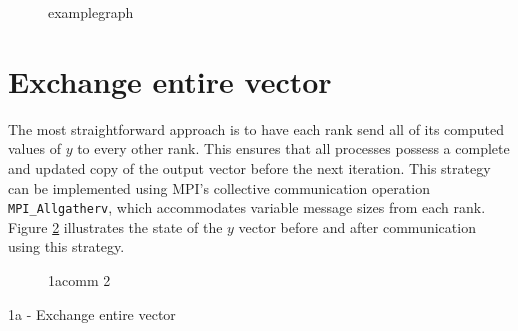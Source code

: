 


\begin{figure}[ht]
    \centering
    \caption{examplegraph}
    \label{fig:examplegraph}
\end{figure}

\section{Exchange entire vector}


The most straightforward approach is to have each rank send all of its computed values of 
\(y\) to every other rank. This ensures that all processes possess a complete and updated copy of the output vector before the next iteration. This strategy can be implemented using MPI’s collective communication operation \texttt{MPI\_Allgatherv}, which accommodates variable message sizes from each rank. Figure \ref{fig:1acomm} illustrates the state of the \(y\) vector before and after communication using this strategy.



\begin{figure}[ht]
    \centering
    \caption{1acomm 2}
    \label{fig:1acomm}
\end{figure}


\begin{algorithm}[H]
    \caption{1a - Exchange entire vector}
    \SetAlgoVlined


\end{algorithm}

